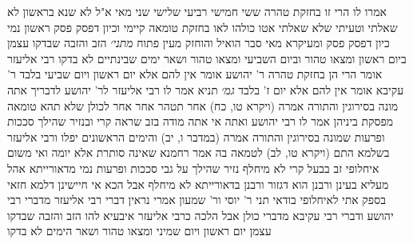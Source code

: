 \documentclass[12pt, openany]{book}
\begin{document}
{אמרו לו  הרי זו בחזקת טהרה  ששי חמישי רביעי שלישי שני מאי  א"ל  לא שנא 
בראשון לא שאלתי וטעיתי שלא שאלתי  אטו כולהו לאו בחזקת טומאה קיימי  וכיון דפסק פסק ראשון נמי כיון דפסק פסק 
ומעיקרא מאי סבר  הואיל והוחזק מעין פתוח
{\large\emph{מתני׳}} הזב והזבה שבדקו עצמן ביום ראשון ומצאו טהור וביום השביעי ומצאו טהור ושאר ימים שבינתיים לא בדקו רבי אליעזר אומר הרי הן בחזקת טהרה  ר' יהושע אומר  אין להם אלא יום ראשון ויום שביעי בלבד  ר' עקיבא אומר  אין להם אלא יום ז' בלבד
{\large\emph{גמ׳}} תניא אמר לו רבי אליעזר לר' יהושע לדבריך אתה מונה בסירוגין והתורה אמרה (ויקרא טו, כח) אחר תטהר אחר אחר לכולן שלא תהא טומאה מפסקת ביניהן 
אמר לו רבי יהושע  ואתה אי אתה מודה בזב שראה קרי ובנזיר שהילך סככות ופרעות שמונה בסירוגין  והתורה אמרה (במדבר ו, יב) והימים הראשונים יפלו 
ורבי אליעזר  בשלמא התם (ויקרא טו, לב) לטמאה בה אמר רחמנא שאינה סותרת אלא יומה ואי משום איחלופי זב בבעל קרי לא מיחלף 
נזיר שהילך על גבי סככות ופרעות נמי מדאורייתא אהל מעליא בעינן ורבנן הוא דגזור ורבנן בדאורייתא לא מיחלף 
אבל הכא אי חיישינן דלמא חזאי בספק אתי לאיחלופי בודאי 
תני ר' יוסי ור' שמעון אמרי  נראין דברי רבי אליעזר מדברי רבי יהושע ודברי רבי עקיבא מדברי כולן אבל הלכה כרבי אליעזר
איבעיא להו  הזב והזבה שבדקו עצמן יום ראשון ויום שמיני ומצאו טהור ושאר הימים לא בדקו}
\end{document}

